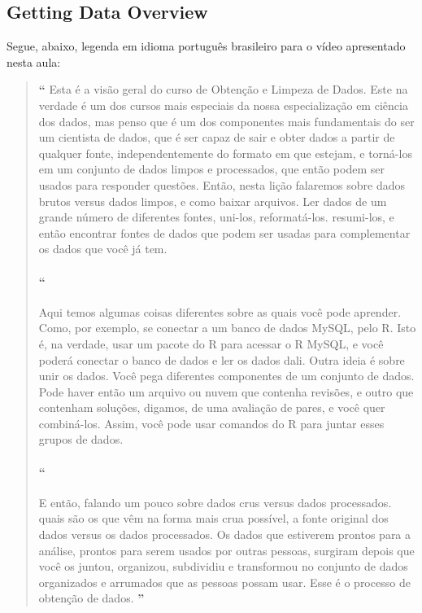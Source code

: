 \subsection{Getting Data Overview}

Segue, abaixo, legenda em idioma português brasileiro para o vídeo apresentado nesta aula:

\begin{quotation}%
\begin{small}
{\large\textbf{``}}%
Esta é a visão geral do curso de Obtenção e Limpeza de Dados. Este na verdade é um dos cursos mais especiais da nossa especialização em ciência dos dados, mas penso que é um dos componentes mais fundamentais do ser um cientista de dados, que é ser capaz de sair e obter dados a partir de qualquer fonte, independentemente do formato em que estejam, e torná-los em um conjunto de dados limpos e processados, que então podem ser usados para responder questões. Então, nesta lição falaremos sobre dados brutos versus dados limpos, e como baixar arquivos. Ler dados de um grande número de  diferentes fontes, uni-los, reformatá-los. resumi-los, e então encontrar fontes de dados que podem ser usadas para complementar os dados que você já tem.

\paragraph{``}
Aqui temos algumas coisas diferentes sobre as quais você pode aprender. Como, por exemplo, se conectar a um banco de dados MySQL, pelo R. Isto é, na verdade, usar um pacote do R para acessar o R MySQL, e você poderá conectar o banco de dados e ler os dados dali. Outra ideia é sobre unir os dados. Você pega diferentes componentes de um conjunto de dados. Pode haver então um arquivo ou nuvem que contenha revisões, e outro que contenham soluções, digamos, de uma avaliação de pares, e você quer combiná-los. Assim, você pode usar comandos do R para juntar esses grupos de dados.

\paragraph{``}
E então, falando um pouco sobre dados crus versus dados processados. quais são os que vêm na forma mais crua possível, a fonte original dos dados versus os dados processados. Os dados que estiverem prontos para a análise,  prontos para serem usados por outras pessoas, surgiram depois que você os juntou, organizou, subdividiu e transformou  no conjunto de dados organizados e arrumados que as pessoas possam usar. Esse é o processo de obtenção de dados.
{\large\textbf{''}}
\end{small}
\end{quotation}


